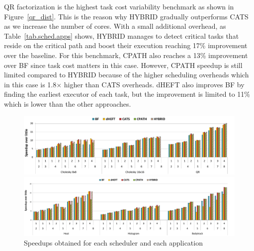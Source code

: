 QR factorization is the highest task cost variability benchmark as shown in Figure~\ref{qr_dist}.
This is the reason why HYBRID gradually outperforms CATS as we increase the number of cores.
With a small additional overhead,
as Table~\ref{tab.sched.apps} shows, HYBRID manages to detect critical tasks that reside on the critical path and boost their execution reaching 17\% improvement over the baseline.
For this benchmark, CPATH also reaches a 13\% improvement over BF since task cost matters in this case. 
However, CPATH speedup is still limited compared to HYBRID because of the higher scheduling overheads which in this case is 1.8$\times$ higher than CATS overheads.
dHEFT also improves BF by finding the earliest executor of each task, but the improvement is limited to 11\% which is lower than the other approaches.
\begin{figure}[!t]
	\includegraphics[width=\textwidth]{figures/speedup_apps1.pdf}
	\vspace{-0.4cm}
	
	\includegraphics[width=\textwidth]{figures/speedup_apps2.pdf}
	\caption{Speedups obtained for each scheduler and each application}
	\label{speedup}
	\vspace{-0.4cm}
\end{figure}  


